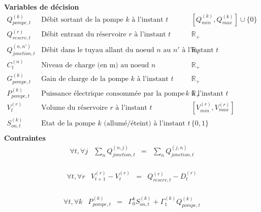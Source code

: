 \documentclass{article}
\begin{document}
\textbf{Variables de décision}
$$
\left.
    \begin{array}{lll}
        Q_{pompe,t}^{(k)}       &   \text{Débit sortant de la pompe $k$ à l'instant $t$}    & [Q_{min}^{(k)},Q_{max}^{(k)}]\cup\{0\}\\[0.2cm]
        Q_{reserv,t}^{(r)}      &   \text{Débit entrant du réservoire $r$ à l'instant $t$}  & \mathbb{R}_+\\[0.2cm]
        Q_{jonction,t}^{(n,n')}   &   \text{Débit dans le tuyau allant du noeud $n$ au $n'$ à l'instant $t$}  &   \mathbb{R}_+\\[0.2cm]
        C_t^{(n)}               &   \text{Niveau de charge (en m) au noeud $n$}             & \mathbb{R}_+\\[0.2cm]
        G_{pompe,t}^{(k)}       &   \text{Gain de charge de la pompe $k$ à l'instant $t$}   & \mathbb{R}_+\\[0.2cm]
        P_{pompe,t}^{(k)}       &   \text{Puissance électrique consommée par la pompe $k$ à l'instant $t$}& \mathbb{R}_+\\[0.2cm]
        V_t^{(r)}               &   \text{Volume du réservoire $r$ à l'instant $t$}& [V_{min}^{(r)},V_{max}^{(r)}]\\[0.2cm]
        S_{on,t}^{(k)}          &   \text{Etat de la pompe $k$ (allumé/éteint) à l'instant $t$}&\{0,1\}\\[0.2cm]
    \end{array}
\right.
$$
\textbf{Contraintes}
\begin{equation}
    \tag{Equilibre flux}  
    \left.
        \begin{array}{lcccc}
            \forall t,\forall j   &   \sum_{n} Q_{jonction,t}^{(n,j)}    & = &   \sum_{n} Q_{jonction,t}^{(j,n)}\\[0.2cm]
        \end{array}
    \right.
\end{equation}

\begin{equation}
    \tag{Satisfaction demande}  
    \left.
        \begin{array}{lcccc}
            \forall t, \forall r   &   V_{t+1}^{(r)}-V_t^{(r)}     & = &   Q_{reserv,t}^{(r)} - D_t^{(r)}\\[0.2cm]
        \end{array}
    \right.
\end{equation}
    
\begin{equation}
    \tag{Conso. élec pompe}  
    \left.
        \begin{array}{lccc}
            \forall t, \forall k   &   P_{pompe,t}^{(k)}     & = &   \Gamma_0^{k}S_{on,t}^{(k)} + \Gamma_1^{(k)}Q_{pompe,t}^{(k)}\\[0.2cm]
        \end{array}
    \right.
\end{equation}
\end{document}
